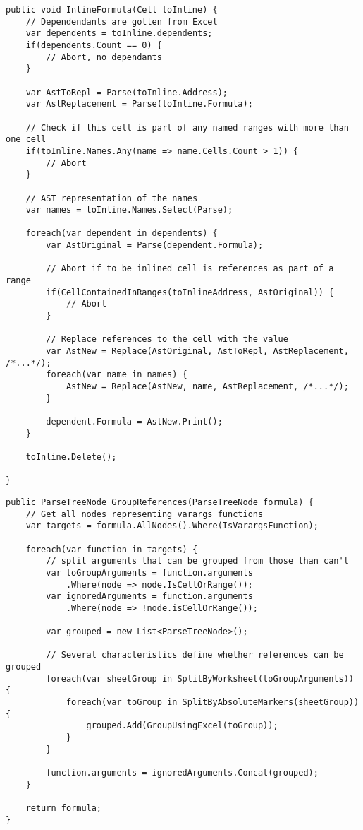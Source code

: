 \lstset{style=sharpc}
\begin{lstlisting}[float,caption={Inline Formula Refactoring (simplified)}, label={lst:inlineformula}]
public void InlineFormula(Cell toInline) {
	// Dependendants are gotten from Excel
	var dependents = toInline.dependents;
	if(dependents.Count == 0) {
		// Abort, no dependants
	}
	
	var AstToRepl = Parse(toInline.Address);
	var AstReplacement = Parse(toInline.Formula);
	
	// Check if this cell is part of any named ranges with more than one cell
	if(toInline.Names.Any(name => name.Cells.Count > 1)) {
		// Abort
	}
	
	// AST representation of the names
	var names = toInline.Names.Select(Parse);
	
	foreach(var dependent in dependents) {
		var AstOriginal = Parse(dependent.Formula);
		
		// Abort if to be inlined cell is references as part of a range
		if(CellContainedInRanges(toInlineAddress, AstOriginal)) {
			// Abort
		}
		
		// Replace references to the cell with the value
		var AstNew = Replace(AstOriginal, AstToRepl, AstReplacement, /*...*/);
		foreach(var name in names) {
			AstNew = Replace(AstNew, name, AstReplacement, /*...*/);
		}
		
		dependent.Formula = AstNew.Print();
	}
	
	toInline.Delete();
	
}
\end{lstlisting}

\lstset{style=sharpc}
\begin{lstlisting}[float,caption={Group References Refactoring (simplified)}, label={lst:groupreferences}]
public ParseTreeNode GroupReferences(ParseTreeNode formula) {
	// Get all nodes representing varargs functions
	var targets = formula.AllNodes().Where(IsVarargsFunction);
	
	foreach(var function in targets) {
		// split arguments that can be grouped from those than can't
		var toGroupArguments = function.arguments
			.Where(node => node.IsCellOrRange());
		var ignoredArguments = function.arguments
			.Where(node => !node.isCellOrRange());
		
		var grouped = new List<ParseTreeNode>();
		
		// Several characteristics define whether references can be grouped
		foreach(var sheetGroup in SplitByWorksheet(toGroupArguments)) {
			foreach(var toGroup in SplitByAbsoluteMarkers(sheetGroup)) {
				grouped.Add(GroupUsingExcel(toGroup));
			}
		}
		
		function.arguments = ignoredArguments.Concat(grouped);
	}
	
	return formula;
}

\end{lstlisting}
